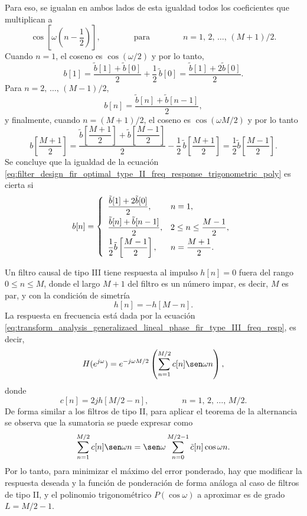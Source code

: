 \documentclass[a4paper]{report}
\begin{document}
Para eso, se igualan en ambos lados de esta igualdad todos los coeficientes que multiplican a 
\[
 \cos\left[\omega\left(n-\frac{1}{2}\right)\right],
 \qquad\qquad \textrm{para}\qquad\qquad 
 n=1,\,2,\,\dots,\,(M+1)/2.
\]
Cuando \(n=1\), el coseno es \(\cos(\omega/2)\) y por lo tanto,
\[
 b[1]=\frac{\tilde{b}[1]+\tilde{b}[0]}{2}+\frac{1}{2}\,\tilde{b}[0]=\frac{\tilde{b}[1]+2\tilde{b}[0]}{2}.
\]
Para \(n=2,\,\dots,\,(M-1)/2\),
\[
 b[n]=\frac{\tilde{b}[n]+\tilde{b}[n-1]}{2},
\]
y finalmente, cuando \(n=(M+1)/2\), el coseno es \(\cos(\omega M/2)\) y por lo tanto
\[
 b\left[\frac{M+1}{2}\right]=\dfrac{\tilde{b}\left[\dfrac{M+1}{2}\right]+\tilde{b}\left[\dfrac{M-1}{2}\right]}{2}-\frac{1}{2}\,\tilde{b}\left[\frac{M+1}{2}\right]=\frac{1}{2}\tilde{b}\left[\dfrac{M-1}{2}\right].
\]
Se concluye que la igualdad de la ecuación \ref{eq:filter_design_fir_optimal_type_II_freq_response_trigonometric_poly} es cierta si
\begin{equation}\label{eq:filter_design_fir_optimal_type_II_freq_response_trigonometric_poly_bn}
 b[n]=\left\{ 
 \begin{array}{ll}
  \dfrac{\tilde{b}[1]+2\tilde{b}[0]}{2},& n=1,\\[\medskipamount]
  \dfrac{\tilde{b}[n]+\tilde{b}[n-1]}{2},& 2\leq n\leq\dfrac{M-1}{2},\\[\medskipamount]
  \dfrac{1}{2}\tilde{b}\left[\dfrac{M-1}{2}\right], & n=\dfrac{M+1}{2}.
 \end{array}
 \right.
\end{equation}

Un filtro causal de tipo III tiene respuesta al impulso \(h[n]=0\) fuera del rango \(0\leq n\leq M\), donde el largo \(M+1\) del filtro es un número impar, es decir, \(M\) es par, y con la condición de simetría
\[
 h[n]=-h[M-n].
\]
La respuesta en frecuencia está dada por la ecuación \ref{eq:transform_analysis_generalizaed_lineal_phase_fir_type_III_freq_resp}, es decir,
\[
 H(e^{j\omega})=e^{-j\omega M/2}\left(\sum_{n=1}^{M/2}c[n]\sen\omega n\right), 
\]
donde
\[
 c[n]=2jh[M/2-n],
 \qquad\qquad 
 n=1,\,2,\,\dots,\,M/2.
\]
De forma similar a los filtros de tipo II, para aplicar el teorema de la alternancia se observa que la sumatoria se puede expresar como
\begin{equation}\label{eq:filter_design_fir_optimal_type_III_freq_response_trigonometric_poly}
 \sum_{n=1}^{M/2}c[n]\sen\omega n=\sen\omega\sum_{n=0}^{M/2-1}\tilde{c}[n]\cos\omega n. 
\end{equation}
Por lo tanto, para minimizar el máximo del error ponderado, hay que modificar la respuesta deseada y la función de ponderación de forma análoga al caso de filtros de tipo II, y el polinomio trigonométrico \(P(\cos\omega)\) a aproximar es de grado \(L=M/2-1\). 
\end{document}
